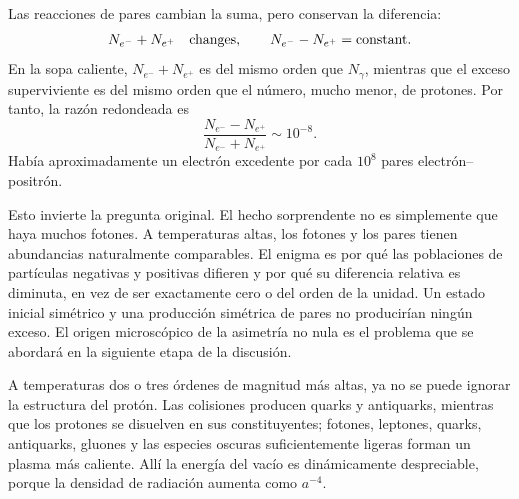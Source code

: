 \begin{classroomqa}
\end{classroomqa}

Las reacciones de pares cambian la suma, pero conservan la diferencia:
\begin{equation}
N_{e^-}+N_{e^+}\quad\hbox{changes},
\qquad
N_{e^-}-N_{e^+}=\hbox{constant}.
\label{eq:c07-pair-invariants}
\end{equation}
En la sopa caliente, \(N_{e^-}+N_{e^+}\) es del mismo orden que \(N_\gamma\), mientras que el exceso superviviente es del mismo orden que el número, mucho menor, de protones. Por tanto, la razón redondeada es
\begin{equation}
\boxed{
\frac{N_{e^-}-N_{e^+}}
{N_{e^-}+N_{e^+}}
\sim10^{-8}
}.
\label{eq:c07-asymmetry}
\end{equation}
Había aproximadamente un electrón excedente por cada \(10^8\) pares electrón--positrón.

Esto invierte la pregunta original. El hecho sorprendente no es simplemente que haya muchos fotones. A temperaturas altas, los fotones y los pares tienen abundancias naturalmente comparables. El enigma es por qué las poblaciones de partículas negativas y positivas difieren y por qué su diferencia relativa es diminuta, en vez de ser exactamente cero o del orden de la unidad. Un estado inicial simétrico y una producción simétrica de pares no producirían ningún exceso. El origen microscópico de la asimetría no nula es el problema que se abordará en la siguiente etapa de la discusión.

A temperaturas dos o tres órdenes de magnitud más altas, ya no se puede ignorar la estructura del protón. Las colisiones producen quarks y antiquarks, mientras que los protones se disuelven en sus constituyentes; fotones, leptones, quarks, antiquarks, gluones y las especies oscuras suficientemente ligeras forman un plasma más caliente. Allí la energía del vacío es dinámicamente despreciable, porque la densidad de radiación aumenta como \(a^{-4}\).


